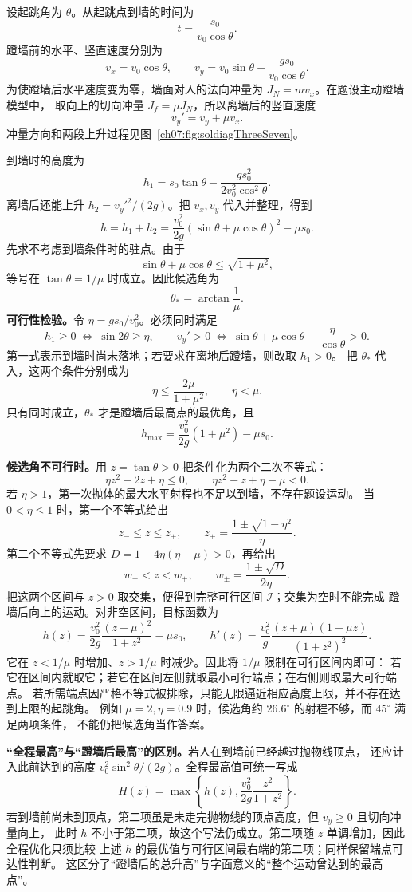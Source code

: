 \begin{xesolution}
设起跳角为 $\theta$。从起跳点到墙的时间为
\[
 t=\frac{s_0}{v_0\cos\theta}.
\]
蹬墙前的水平、竖直速度分别为
\[
 v_x=v_0\cos\theta,
 \qquad
 v_y=v_0\sin\theta-\frac{gs_0}{v_0\cos\theta}.
\]
为使蹬墙后水平速度变为零，墙面对人的法向冲量为 $J_N=mv_x$。在题设主动蹬墙模型中，
取向上的切向冲量 $J_f=\mu J_N$，所以离墙后的竖直速度
\[
 v_y'=v_y+\mu v_x.
\]
冲量方向和两段上升过程见图~\ref{ch07:fig:soldiagThreeSeven}。

\soldiagThreeSeven
到墙时的高度为
\[
 h_1=s_0\tan\theta-\frac{gs_0^2}{2v_0^2\cos^2\theta}.
\]
离墙后还能上升 $h_2={v_y'}^2/(2g)$。把 $v_x,v_y$ 代入并整理，得到
\[
 h=h_1+h_2
 =\frac{v_0^2}{2g}(\sin\theta+\mu\cos\theta)^2-\mu s_0.
\]
先求不考虑到墙条件时的驻点。由于
\[
 \sin\theta+\mu\cos\theta
 \le\sqrt{1+\mu^2},
\]
等号在 $\tan\theta=1/\mu$ 时成立。因此候选角为
\[
 \theta_* =\arctan\frac{1}{\mu}.
\]
\textbf{可行性检验。}\quad 令 $\eta=gs_0/v_0^2$。必须同时满足
\[
 h_1\ge0\ \Longleftrightarrow\ \sin2\theta\ge\eta,
 \qquad
 v_y'>0\ \Longleftrightarrow\
 \sin\theta+\mu\cos\theta-\frac{\eta}{\cos\theta}>0.
\]
第一式表示到墙时尚未落地；若要求在离地后蹬墙，则改取 $h_1>0$。
把 $\theta_*$ 代入，这两个条件分别成为
\[
 \eta\le\frac{2\mu}{1+\mu^2},\qquad \eta<\mu.
\]
只有同时成立，$\theta_*$ 才是蹬墙后最高点的最优角，且
\[
 h_{\max}=\frac{v_0^2}{2g}(1+\mu^2)-\mu s_0.
\]

\textbf{候选角不可行时。}\quad 用 $z=\tan\theta>0$ 把条件化为两个二次不等式：
\[
 \eta z^2-2z+\eta\le0,
 \qquad
 \eta z^2-z+\eta-\mu<0.
\]
若 $\eta>1$，第一次抛体的最大水平射程也不足以到墙，不存在题设运动。
当 $0<\eta\le1$ 时，第一个不等式给出
\[
 z_-\le z\le z_+,
 \qquad z_\pm=\frac{1\pm\sqrt{1-\eta^2}}{\eta}.
\]
第二个不等式先要求 $D=1-4\eta(\eta-\mu)>0$，再给出
\[
 w_-<z<w_+,\qquad w_\pm=\frac{1\pm\sqrt D}{2\eta}.
\]
把这两个区间与 $z>0$ 取交集，便得到完整可行区间 $\mathcal I$；交集为空时不能完成
蹬墙后向上的运动。对非空区间，目标函数为
\[
 h(z)=\frac{v_0^2}{2g}\frac{(z+\mu)^2}{1+z^2}-\mu s_0,
 \qquad
 h'(z)=\frac{v_0^2}{g}\frac{(z+\mu)(1-\mu z)}{(1+z^2)^2}.
\]
它在 $z<1/\mu$ 时增加、$z>1/\mu$ 时减少。因此将 $1/\mu$ 限制在可行区间内即可：
若它在区间内就取它；若它在区间左侧就取最小可行端点；在右侧则取最大可行端点。
若所需端点因严格不等式被排除，只能无限逼近相应高度上限，并不存在达到上限的起跳角。
例如 $\mu=2,\eta=0.9$ 时，候选角约 $26.6^\circ$ 的射程不够，而 $45^\circ$ 满足两项条件，
不能仍把候选角当作答案。

\textbf{“全程最高”与“蹬墙后最高”的区别。}\quad 若人在到墙前已经越过抛物线顶点，
还应计入此前达到的高度 $v_0^2\sin^2\theta/(2g)$。全程最高值可统一写成
\[
 H(z)=\max\left\{h(z),\frac{v_0^2}{2g}\frac{z^2}{1+z^2}\right\}.
\]
若到墙前尚未到顶点，第二项虽是未走完抛物线的顶点高度，但 $v_y\ge0$ 且切向冲量向上，
此时 $h$ 不小于第二项，故这个写法仍成立。第二项随 $z$ 单调增加，因此全程优化只须比较
上述 $h$ 的最优值与可行区间最右端的第二项；同样保留端点可达性判断。
这区分了“蹬墙后的总升高”与字面意义的“整个运动曾达到的最高点”。
\end{xesolution}

